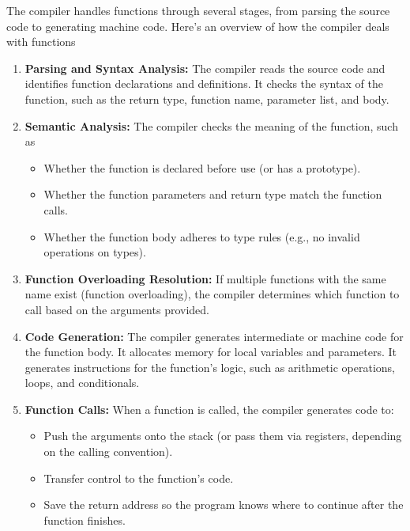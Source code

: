 \documentclass{report}
\begin{document}
    \pagebreak 
    \bigbreak \noindent 
     The compiler handles functions through several stages, from parsing the source code to generating machine code. Here's an overview of how the compiler deals with functions
     \begin{enumerate}
         \item \textbf{Parsing and Syntax Analysis:} The compiler reads the source code and identifies function declarations and definitions.
             \bigbreak \noindent 
                It checks the syntax of the function, such as the return type, function name, parameter list, and body.
         \item \textbf{Semantic Analysis:} The compiler checks the meaning of the function, such as
             \begin{itemize}
                 \item Whether the function is declared before use (or has a prototype).
                 \item Whether the function parameters and return type match the function calls.
                 \item Whether the function body adheres to type rules (e.g., no invalid operations on types).
             \end{itemize}
         \item \textbf{Function Overloading Resolution:} If multiple functions with the same name exist (function overloading), the compiler determines which function to call based on the arguments provided.
         \item \textbf{Code Generation:} The compiler generates intermediate or machine code for the function body.
             \bigbreak \noindent 
            It allocates memory for local variables and parameters.
            \bigbreak \noindent 
            It generates instructions for the function's logic, such as arithmetic operations, loops, and conditionals.
         \item \textbf{Function Calls:} When a function is called, the compiler generates code to:
             \begin{itemize}
                 \item Push the arguments onto the stack (or pass them via registers, depending on the calling convention).
                 \item Transfer control to the function's code.
                 \item Save the return address so the program knows where to continue after the function finishes.

\end{itemize}
\end{enumerate}
\end{document}
